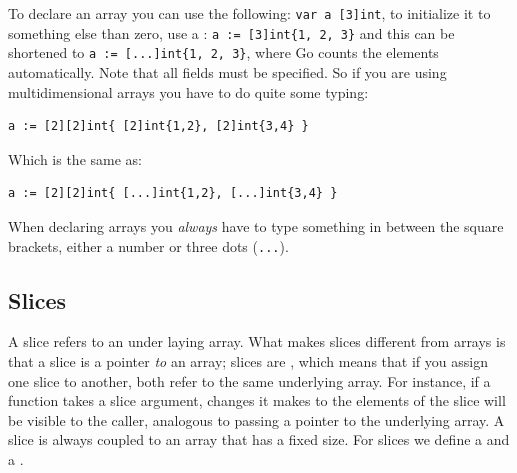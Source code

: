 To declare an array you can use the following: \lstinline{var a [3]int},
to initialize it to something else than zero, use a : \lstinline|a := [3]int{1, 2, 3}| and
this can be shortened to \lstinline|a := [...]int{1, 2, 3}|, where Go counts
the elements automatically. 
Note that all fields must be specified.  So if you are using multidimensional
arrays you have to do quite some typing:
\begin{lstlisting}
a := [2][2]int{ [2]int{1,2}, [2]int{3,4} }
\end{lstlisting}
Which is the same as:
\begin{lstlisting}
a := [2][2]int{ [...]int{1,2}, [...]int{3,4} }
\end{lstlisting}

When declaring arrays you \emph{always} have to type something in
between the square brackets, either a number or three dots (\verb|...|).


\subsection{Slices}
A slice refers to an under laying array. What makes slices different
from
arrays is that a slice is a pointer \emph{to} an array;
slices are , which means that if you assign one slice to
another, both refer to the same underlying array. For instance, if a
function takes a slice argument, changes it makes to the elements of the
slice will be visible to the caller, analogous to passing a pointer to
the underlying array. A slice is always coupled to an array that has
a fixed size. For slices we define a  and a
. 

